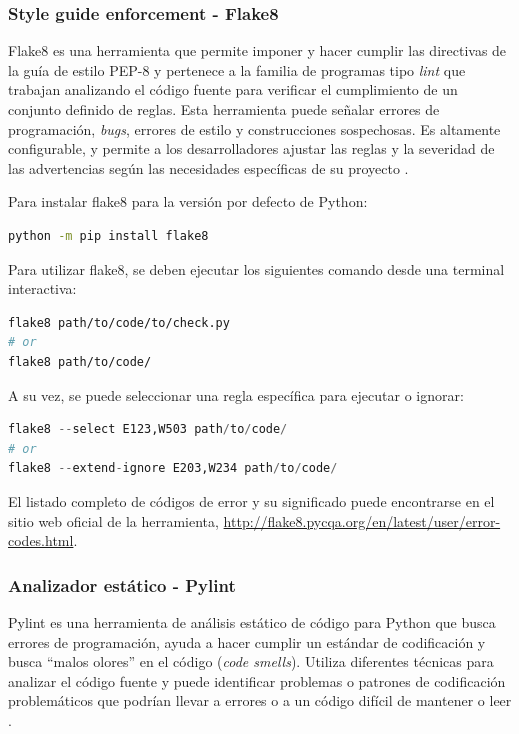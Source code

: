 \subsubsection{Style guide enforcement - Flake8}

Flake8 es una herramienta que permite imponer y hacer cumplir las directivas de la guía de estilo PEP-8 y pertenece a la familia de programas tipo \textit{lint} que trabajan analizando el código fuente para verificar el cumplimiento de un conjunto definido de reglas. Esta herramienta puede señalar errores de programación, \textit{bugs}, errores de estilo y construcciones sospechosas. Es altamente configurable, y permite a los desarrolladores ajustar las reglas y la severidad de las advertencias según las necesidades específicas de su proyecto \citep{flake8}.

Para instalar flake8 para la versión por defecto de Python:

\begin{lstlisting}[language=bash]
python -m pip install flake8
\end{lstlisting}

Para utilizar flake8, se deben ejecutar los siguientes comando desde una terminal interactiva:

\begin{lstlisting}[language=bash]
flake8 path/to/code/to/check.py
# or
flake8 path/to/code/
\end{lstlisting}


A su vez, se puede seleccionar una regla específica para ejecutar o ignorar:

\begin{lstlisting}[language={python}]
flake8 --select E123,W503 path/to/code/
# or
flake8 --extend-ignore E203,W234 path/to/code/
\end{lstlisting}

El listado completo de códigos de error y su significado puede encontrarse en el sitio web oficial de la herramienta, \url{http://flake8.pycqa.org/en/latest/user/error-codes.html}.

\subsubsection{Analizador estático - Pylint}
Pylint es una herramienta de análisis estático de código para Python que busca errores de programación, ayuda a hacer cumplir un estándar de codificación y busca ``malos olores'' en el código (\textit{code smells}). Utiliza diferentes técnicas para analizar el código fuente y puede identificar problemas o patrones de codificación problemáticos que podrían llevar a errores o a un código difícil de mantener o leer \citep{pylint}. 

